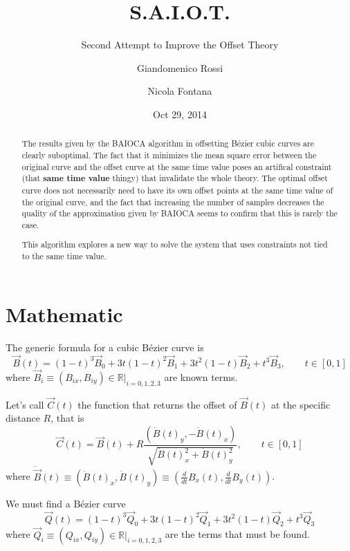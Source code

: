 \documentclass{scrartcl}
\title{S.A.I.O.T.}
\subtitle{Second Attempt to Improve the Offset Theory}
\author{Giandomenico Rossi \and Nicola Fontana}
\date{Oct 29, 2014}
\newcommand\V[1]{\vec{#1}}
\newcommand\D[1]{\dot{#1}}
\newcommand\DV[1]{\D{\V{#1}}}
\begin{document}
\maketitle

\begin{abstract}
The results given by the BAIOCA algorithm in offsetting Bézier cubic
curves are clearly suboptimal. The fact that it minimizes the mean
square error between the original curve and the offset curve at the same
time value poses an artifical constraint (that \textbf{same time value}
thingy) that invalidate the whole theory. The optimal offset curve does
not necessarily need to have its own offset points at the same time
value of the original curve, and the fact that increasing the number of
samples decreases the quality of the approximation given by BAIOCA seems
to confirm that this is rarely the case.

This algorithm explores a new way to solve the system that uses
constraints not tied to the same time value.
\end{abstract}

\section{Mathematic}

The generic formula for a cubic Bézier curve is
\begin{equation*}
    \V{B}(t) =
	(1-t)^3 \V{B}_0 +
	3t (1-t)^2 \V{B}_1 +
	3t^2 (1-t) \V{B}_2 +
	t^3 \V{B}_3,
    \qquad t \in [ 0,1 ]
\end{equation*}
where $\V{B}_i \equiv ( B_{ix}, B_{iy} ) \in \mathbb{R} |_{i = 0,1,2,3}$
are known terms.

Let's call $\V{C}(t)$ the function that returns the offset of
$\V{B}(t)$ at the specific distance $R$, that is
\begin{equation}\label{eq:C}
\V{C}(t) = \V{B}(t) + R
    \frac{(\D{B}(t)_y, -\D{B}(t)_x)}{\sqrt{\D{B}(t)_x^2 + \D{B}(t)_y^2}},
    \qquad t \in [ 0,1 ]
\end{equation}
where $\DV{B}(t) \equiv ( \D{B}(t)_x, \D{B}(t)_y ) \equiv \left( \frac{d}{dt}
B_x(t), \frac{d}{dt} B_y(t) \right)$.

We must find a Bézier curve
\begin{equation}\label{eq:Q}
    \V{Q}(t) =
	(1-t)^3 \V{Q}_0 +
	3t (1-t)^2 \V{Q}_1 +
	3t^2 (1-t) \V{Q}_2 +
	t^3 \V{Q}_3
\end{equation}
where $\V{Q}_i \equiv ( Q_{ix}, Q_{iy} ) \in \mathbb{R} |_{i = 0,1,2,3}$
are the terms that must be found.
\end{document}
